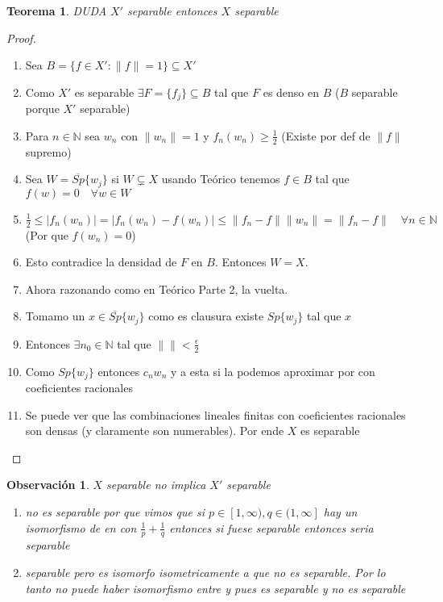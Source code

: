 \documentclass[10pt]{extarticle}
\theoremstyle{break}
\newtheorem{theorem}{Teorema}[section]
\newtheorem*{remark}{Observación}
\theoremstyle{definition}
\begin{document}
\begin{theorem} DUDA
$X'$ separable entonces $X$ separable
\end{theorem}

\begin{proof}
	\begin{enumerate}
		\item Sea $B=\{ f\in X':\lVert f \rVert=1 \}\subseteq X'$
		\item Como $X'$ es separable $\exists F=\{ f_{j} \}\subseteq B$ tal que $F$ es denso en $B$ ($B$ separable porque $X'$ separable)
		\item Para $n\in \mathbb{N}$ sea $w_{n}$ con $\lVert w_{n} \rVert=1$ y $f_{n}(w_{n})\geq \frac{1}{2}$ (Existe por def de $\lVert f \rVert$ supremo)
		\item Sea $W=\overline{Sp}\{ w_{j} \}$ si $W\subsetneq X$ usando Teórico tenemos $f\in B$ tal que $f(w)=0\quad\forall w\in W$
		\item $\frac{1}{2}\leq \lvert f_{n}(w_{n}) \rvert=\lvert f_{n}(w_{n})-f(w_{n}) \rvert\leq \lVert f_{n}-f \rVert\lVert w_{n} \rVert=\lVert f_{n}-f \rVert\quad\forall n\in \mathbb{N}$ (Por que $f(w_{n})=0$)
		\item Esto contradice la densidad de $F$ en $B$. Entonces $W=X$.
		\item Ahora razonando como en Teórico Parte 2, la vuelta.
		\item Tomamo un $x\in \overline{Sp}\{ w_{j} \}$ como es clausura existe $Sp\{ w_{j} \}$ tal que $x$
		\item Entonces $\exists n_{0}\in \mathbb{N}$ tal que $\lVert \rVert<\frac{\epsilon}{2}$
		\item Como $Sp\{ w_{j} \}$ entonces $c_{n}w_{n}$ y a esta si la podemos aproximar por con coeficientes racionales
		\item Se puede ver que las combinaciones lineales finitas con coeficientes racionales son densas (y claramente son numerables). 
			Por ende $X$ es separable
	\end{enumerate}
\end{proof}

\begin{remark} $X$ separable no implica $X'$ separable
\begin{enumerate}
\item no es separable por que vimos que si $p \in [1,\infty),q \in (1,\infty]$ hay un isomorfismo de en con $\frac{1}{p}+\frac{1}{q}$ entonces si fuese separable entonces seria separable
\item separable pero es isomorfo isometricamente a que no es separable. Por lo tanto no puede haber isomorfismo entre y pues es separable y no es separable
\end{enumerate}
\end{remark}
\end{document}
